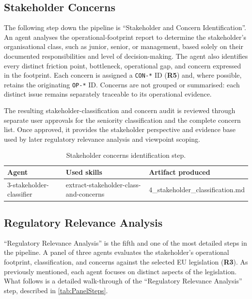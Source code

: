 \subsection{Stakeholder Concerns}

The following step down the pipeline is ``Stakeholder and Concern Identification''. An agent analyses the operational-footprint report to determine the stakeholder’s organisational class, such as junior, senior, or management, based solely on their documented responsibilities and level of decision-making.
The agent also identifies every distinct friction point, bottleneck, operational gap, and concern expressed in the footprint. Each concern is assigned a \texttt{CON-*} \ac{ID} (\textbf{R5}) and, where possible, retains the originating \texttt{OP-*} \ac{ID}. Concerns are not grouped or summarised: each distinct issue remains separately traceable to its operational evidence.

The resulting stakeholder-classification and concern audit is reviewed through separate user approvals for the seniority classification and the complete concern list. Once approved, it provides the stakeholder perspective and evidence base used by later regulatory relevance analysis and viewpoint scoping.

\begin{table}[ht]
\centering
\begin{tabular}{lll}
\hline
\textbf{Agent} & \textbf{Used skills} & \textbf{Artifact produced} \\
\hline
3-stakeholder-classifier &
extract-stakeholder-class-and-concerns &
4\_stakeholder\_classification.md \\
\hline
\end{tabular}
\caption{Stakeholder concerns identification step.}
\label{tab:stakeholder-concerns}
\end{table}

\subsection{Regulatory Relevance Analysis}
\label{regRevAnal}

``Regulatory Relevance Analysis'' is the fifth and one of the most detailed steps in the pipeline. A panel of three agents evaluates the stakeholder’s operational footprint, classification, and concerns against the selected EU legislation (\textbf{R3}). As previously mentioned, each agent focuses on distinct aspects of the legislation. What follows is a detailed walk-through of the ``Regulatory Relevance Analysis'' step, described in \ref{tab:PanelSteps}.

